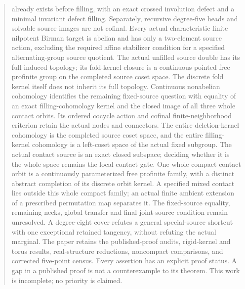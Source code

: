 \documentclass[11pt,a4paper]{article}
\begin{document}
\begin{abstract}
already exists before filling, with an exact crossed involution defect
and a minimal invariant defect filling. Separately, recursive degree-five
heads and solvable source images are not cofinal. Every actual
characteristic finite nilpotent Birman target is abelian and has only
a two-element source action, excluding the required affine stabilizer
condition for a specified alternating-group source quotient.
The actual unfilled source double has its full induced topology; its
fold-kernel closure is a continuous pointed free profinite group on
the completed source coset space. The discrete fold kernel itself
does not inherit its full topology. Continuous nonabelian cohomology
identifies the remaining fixed-source question with equality of an
exact filling-cohomology kernel and the closed image of all three
whole contact orbits. Its ordered cocycle action and cofinal
finite-neighborhood criterion retain the actual nodes and connectors.
The entire deletion-kernel cohomology is the completed source coset
space, and the entire filling-kernel cohomology is a left-coset
space of the actual fixed subgroup. The actual contact source
is an exact closed subspace; deciding whether it is the whole
space remains the local contact gate.
One whole compact contact orbit is a continuously parameterized
free profinite family, with a distinct abstract completion of its
discrete orbit kernel. A specified mixed contact lies outside this
whole compact family; an actual finite ambient extension of a
prescribed permutation map separates it.
The fixed-source equality, remaining necks, global transfer and final
joint-source condition remain unresolved. A degree-eight cover refutes
a general special-source shortcut with one exceptional retained
tangency, without refuting the actual marginal. The paper retains the published-proof audits, rigid-kernel
and torus results, real-structure reductions, noncompact comparisons,
and corrected five-point census. Every assertion has an explicit proof
status. A gap in a published proof is not a counterexample to its theorem.
This work is incomplete; no priority is claimed.
\end{abstract}
\tableofcontents
\clearpage
\end{document}
